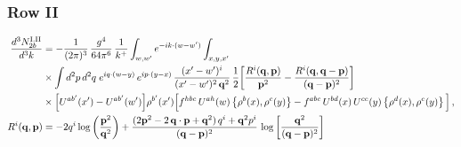 \documentclass[9pt]{article}
\numberwithin{equation}{section}
\begin{document}
\subsubsection*{Row II}
\begin{align}
\frac{d^{3}N^{\rm I.II}_{2b}}{d^{3}k} & = -\frac{1}{(2\pi)^{3}}\,\frac{g^{4}}{64\pi^{6}}\,\frac{1}{k^{+}}\int_{w,w'}e^{-ik\cdot(w-w')}\int_{x,y,x'}\notag\\
&\times\int d^{2}p\,d^{2}q\;e^{iq\cdot(w-y)}\,e^{ip\cdot(y-x)}\,\frac{(x'-w')^{i}}{(x'-w')^{2}\,\mathbf{q}^{2}}\,\frac{1}{2}\bigg[\frac{R^{i}(\mathbf{q},\mathbf{p})}{\mathbf{p}^{2}}-\frac{R^{i}(\mathbf{q},\mathbf{q}-\mathbf{p})}{(\mathbf{q}-\mathbf{p})^{2}}\bigg]\notag\\
&\times\Big[U^{ab'}(x')-U^{ab'}(w')\Big]\rho^{b'}(x')\Big[f^{hbc}\,U^{ah}(w)\left\{\rho^{b}(x),\rho^{c}(y)\right\}-f^{abc}\,U^{bd}(x)\,U^{ce}(y)\left\{\rho^{d}(x),\rho^{e}(y)\right\}\Big]\,,\label{eq:B-I2b}\\
R^{i}(\mathbf{q},\mathbf{p}) & = -2q^{i}\log\left(\frac{\mathbf{p}^{2}}{\mathbf{q}^{2}}\right)+\frac{(2\mathbf{p}^{2}-2\,\mathbf{q}\cdot\mathbf{p}+\mathbf{q}^{2})\,q^{i}+\mathbf{q}^{2}p^{i}}{(\mathbf{q}-\mathbf{p})^{2}}\,\log\left[\frac{\mathbf{q}^{2}}{(\mathbf{q}-\mathbf{p})^{2}}\right]
\end{align}
\end{document}
